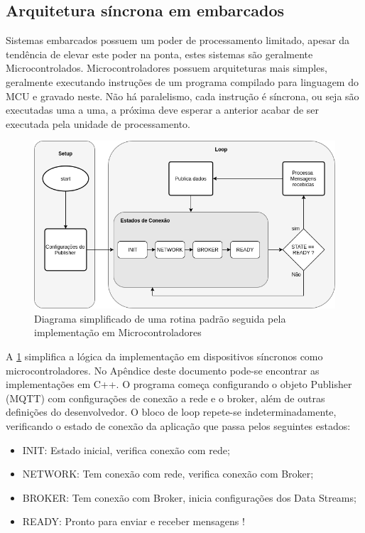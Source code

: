\subsection{Arquitetura síncrona em embarcados}
\label{subsection:embarcados_sinc}

Sistemas embarcados possuem um poder de processamento limitado, apesar da tendência de elevar este poder na ponta, estes sistemas são geralmente Microcontrolados. Microcontroladores possuem arquiteturas mais simples, geralmente executando instruções de um programa compilado para linguagem do MCU e gravado neste. Não há paralelismo, cada instrução é síncrona, ou seja são executadas uma a uma, a próxima deve esperar a anterior acabar de ser executada pela unidade de processamento.

\begin{figure}[h!]
\centering
\includegraphics[width=12cm]{./02_Capitulos/02_Cap3/figures/sinc_implementation}
\caption{Diagrama simplificado de uma rotina padrão seguida pela implementação em Microcontroladores}
\label{fig:sinc-implementation}
\end{figure}

A \ref{fig:sinc-implementation} simplifica a lógica da implementação em dispositivos síncronos como microcontroladores. No Apêndice deste documento pode-se encontrar as implementações em C++. O programa começa configurando o objeto Publisher (MQTT) com configurações de conexão a rede e o broker, além de outras definições do desenvolvedor. O bloco de loop repete-se indeterminadamente, verificando o estado de conexão da aplicação que passa pelos seguintes estados:

\begin{itemize}
\item INIT: Estado inicial, verifica conexão com rede;
\item NETWORK: Tem conexão com rede, verifica conexão com Broker;
\item BROKER: Tem conexão com Broker, inicia configurações dos Data Streams;
\item READY: Pronto para enviar e receber mensagens !
\end{itemize}


